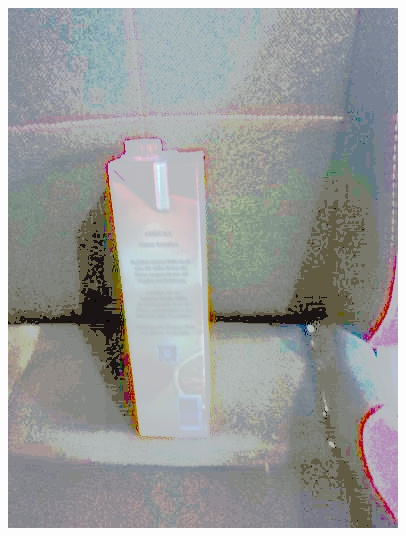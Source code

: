 \begin{appendices}
\begin{figure}[htb]
\begin{minipage}{0.19\textwidth}
\end{minipage}
\begin{minipage}{\textwidth}
\hspace{\textwidth}
\end{minipage}
\begin{minipage}{0.19\textwidth}
\includegraphics[width=\textwidth]{images/anomalien/HS/image157.jpg}
\end{minipage}
\begin{minipage}{0.19\textwidth}

\end{minipage}
\end{figure}
\end{appendices}
